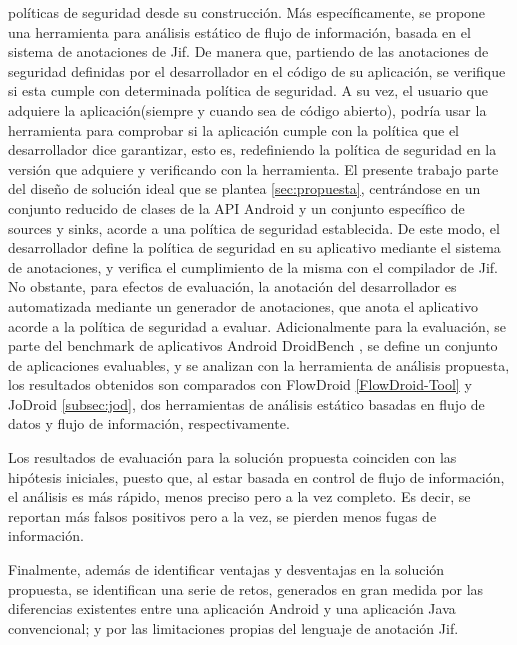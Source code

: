 políticas de seguridad desde su construcción.
Más específicamente, se propone una herramienta para análisis estático de flujo
de información, basada en el sistema de anotaciones de Jif.
De manera que, partiendo de las anotaciones de seguridad definidas por el
desarrollador en el código de su aplicación, se verifique si esta cumple 
con determinada política de seguridad.\newline
A su vez, el usuario que adquiere la aplicación(siempre y cuando sea de
código abierto), podría usar la herramienta para comprobar si la aplicación
cumple con la política que el desarrollador dice garantizar, esto es,
redefiniendo la política de seguridad en la versión que adquiere y verificando
con la herramienta.\newline
El presente trabajo parte del diseño de solución ideal que se plantea
\ref{sec:propuesta}, centrándose en un conjunto reducido de clases de la API
Android y un conjunto específico de sources y sinks, acorde a una política de
seguridad establecida.\newline 
De este modo, el desarrollador define la política de seguridad en su
aplicativo mediante el sistema de anotaciones, y verifica el cumplimiento de la
misma con el compilador de Jif.\newline  
No obstante, para efectos de evaluación, la anotación del desarrollador es
automatizada mediante un generador de anotaciones, que anota el aplicativo
acorde a la política de seguridad a evaluar.\newline
Adicionalmente para la evaluación, se parte del benchmark de aplicativos Android
DroidBench \cite{DroidBenchBenchmarks}, se define un conjunto de aplicaciones
evaluables, y se analizan con la herramienta de análisis propuesta, los
resultados obtenidos son comparados con FlowDroid \ref{FlowDroid-Tool} y
JoDroid \ref{subsec:jod}, dos herramientas de análisis estático basadas en
flujo de datos y flujo de información, respectivamente.

Los resultados de evaluación para la solución propuesta coinciden con las
hipótesis iniciales, puesto que, al estar basada en control de flujo de
información, el análisis es más rápido, menos preciso pero a la vez completo. Es
decir, se reportan más falsos positivos pero a la vez, se pierden menos fugas de
información.

Finalmente, además de identificar ventajas y desventajas en la solución
propuesta, se identifican una serie de retos, generados en gran medida por las
diferencias existentes entre una aplicación Android y una aplicación Java
convencional; y por las limitaciones propias del lenguaje de anotación Jif.

























